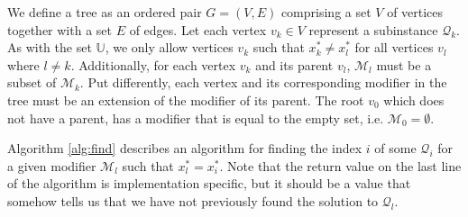 We define a tree as an ordered pair $G = (V,E)$ comprising a set $V$ of
vertices together with a set $E$ of edges.
Let each vertex $v_k \in V$ represent a subinstance $\mathcal{Q}_k$.
As with the set $\mathbb{U}$, we only allow vertices $v_k$ such that
$x_k^* \neq x_l^*$ for all vertices $v_l$ where $l \neq k$.
Additionally, for each vertex $v_k$ and its parent $v_l$, $\mathcal{M}_l$ must
be a subset of $\mathcal{M}_k$.
Put differently, each vertex and its corresponding modifier in the tree must be
an extension of the modifier of its parent.
The root $v_0$ which does not have a parent, has a modifier that is equal
to the empty set, i.e. $\mathcal{M}_0 = \emptyset$.



Algorithm \ref{alg:find} describes
an algorithm for finding the index $i$ of some $\mathcal{Q}_i$ for a given
modifier $\mathcal{M}_l$ such that $x_l^* = x_i^*$. Note that the return value
on the last line of the algorithm is implementation specific, but it should be
a value that somehow tells us that we have not previously found the solution to
$\mathcal{Q}_l$.

